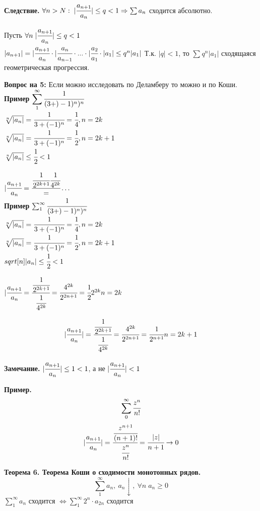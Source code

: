 \documentclass[12pt, paper]{article}
\begin{document}
\textbf{Следствие.} $\forall n > N:\; |\cfrac{a_{n+1}}{a_n}| \leq q < 1 \Rightarrow \sum a_n$ сходится абсолютно.

\begin{tcolorbox}[title=Доказательство следствия]
	Пусть $ \forall n\; |\cfrac{a_{n+1}}{a_n}| \leq q < 1 $\\
$ |a_{n+1}| = |\cfrac{a_{n+1}}{a_n} \cdot |\cfrac{a_{n}}{a_{n-1}} \cdot ... \cdot |\cfrac{a_{2}}{a_1} \cdot |a_1| \leq q^n |a_1|$ Т.к. $|q| < 1$, то $\displaystyle\sum_{}^{} q^n|a_1|$ сходящаяся геометрическая прогрессия.
\end{tcolorbox}
\textbf{Вопрос на 5:} Если можно исследовать по Деламберу то можно и по Коши.\\

\textbf{Пример}
	$\displaystyle\sum_{1}^{\infty} \cfrac{1}{(3+)-1)^n)^n}$\\
	$\sqrt[n]{|a_n|} = \cfrac{1}{3+(-1)^n} = \cfrac{1}{4}, n = 2k$\\
	$\sqrt[n]{|a_n|} = \cfrac{1}{3+(-1)^n} = \cfrac{1}{2}, n = 2k+1$\\
	$\sqrt[n]{|a_n|} \leq \cfrac{1}{2} < 1$

	$|\cfrac{a_{n+1}}{a_{n}} = \cfrac{\cfrac{1}{2^{2k+1}}{\cfrac{1}{4^{2k}}}} = \dots$\\
\textbf{Пример} 
    $\sum_{1}^{\infty} \cfrac{1}{(3+)-1)^n)^n}$\\
	$\sqrt[n]{|a_n|} = \cfrac{1}{3+(-1)^n} = \cfrac{1}{4}, n = 2k$\\
	$\sqrt[n]{|a_n|} = \cfrac{1}{3+(-1)^n} = \cfrac{1}{2}, n = 2k+1$\\
	$sqrt[n]{|a_n|} \leq \cfrac{1}{2} < 1$

$
	|\cfrac{a_{n+1}}{a_{n}} = \cfrac{\cfrac{1}{2^{2k+1}}}{\cfrac{1}{4^{2k}}} = \cfrac{4^{2k}}{2^{2n+1}} = \cfrac{1}{2}2^{2k}
    n = 2k
$

\[
	|\cfrac{a_{n+1}}{a_{n}}| = \cfrac{\cfrac{1}{2^{2k+1}}}{\cfrac{1}{4^{2k}}} = \cfrac{4^{2k}}{2^{2n+1}} = \cfrac{1}{2^{n+1}}\\
    n = 2k+1
\]

\textbf{Замечание.} $|\cfrac{a_{n+1}}{a_n}| \leq 1 < 1$, а не $|\cfrac{a_{n+1}}{a_n}| < 1$

\textbf{Пример.} \[ \sum_0^\infty \cfrac{z^n}{n!} \]
\[ |\cfrac{a_{n+1}}{a_n}| = \cfrac{\cfrac{z^{n+1}}{(n+1)!}}{\cfrac{z^n}{n!}} = \cfrac{|z|}{n+1} \to 0 \]

\textbf{Теорема 6. Теорема Коши о сходимости монотонных рядов. }
\[\sum^{\infty}_{1} a_n,\ a_n \downarrow,\ \forall n\; a_n \geq 0\]
$ \sum^{\infty}_{1} a_n$ сходится $\Leftrightarrow \sum^{\infty}_{1} 2^n \cdot a_{2n}$ сходится
\end{document}

